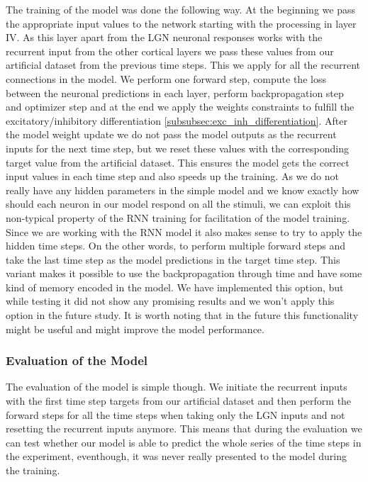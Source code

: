 The training of the model was done the following way. At the beginning we pass the appropriate input values to the network starting with the processing in layer IV. As this layer apart from the LGN neuronal responses works with the recurrent input from the other cortical layers we pass these values from our artificial dataset from the previous time steps. This we apply for all the recurrent connections in the model. We perform one forward step, compute the loss between the neuronal predictions in each layer, perform backpropagation step and optimizer step and at the end we apply the weights constraints to fulfill the excitatory/inhibitory differentiation \ref{subsubsec:exc_inh_differentiation}. After the model weight update we do not pass the model outputs as the recurrent inputs for the next time step, but we reset these values with the corresponding target value from the artificial dataset. This ensures the model gets the correct input values in each time step and also speeds up the training. As we do not really have any hidden parameters in the simple model and we know exactly how should each neuron in our model respond on all the stimuli, we can exploit this non-typical property of the RNN training for facilitation of the model training. Since we are working with the RNN model it also makes sense to try to apply the hidden time steps. On the other words, to perform multiple forward steps and take the last time step as the model predictions in the target time step. This variant makes it possible to use the backpropagation through time and have some kind of memory encoded in the model. We have implemented this option, but while testing it did not show any promising results and we won't apply this option in the future study. It is worth noting that in the future this functionality might be useful and might improve the model performance.

\subsubsection{Evaluation of the Model}
\label{subsubsec:evaluation_model}

The evaluation of the model is simple though. We initiate the recurrent inputs with the first time step targets from our artificial dataset and then perform the forward steps for all the time steps when taking only the LGN inputs and not resetting the recurrent inputs anymore. This means that during the evaluation we can test whether our model is able to predict the whole series of the time steps in the experiment, eventhough, it was never really presented to the model during the training.

